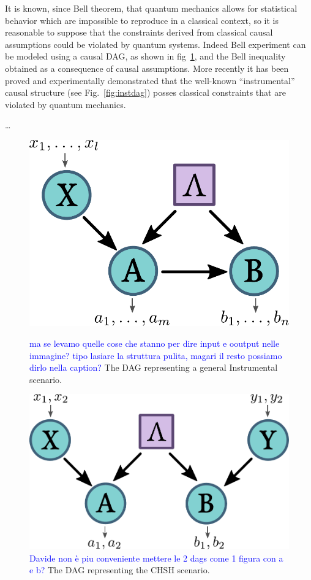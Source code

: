 \documentclass[
    nofootinbin,
    floatfix,
    amsfonts,
    twocolumn, 
    aps, 
    prl]{revtex4-1}
\begin{document}
It is known, since Bell theorem, that quantum mechanics allows for statistical %
behavior which are impossible to reproduce in a classical context, so it is
reasonable to suppose that the constraints derived from classical causal
assumptions could be violated by quantum systems.
Indeed Bell experiment can be modeled using a causal DAG, as shown in
fig~\ref{fig:chshdag}, and the Bell inequality obtained as a consequence of causal
assumptions.
More recently it has been proved and experimentally demonstrated that the
well-known ``instrumental'' causal structure (see Fig.~\ref{fig:instdag})
posses classical constraints that are violated by quantum mechanics. %

\ldots

\begin{figure}[h]
    \centering
    \parbox{.9\columnwidth}{
        \includegraphics[width=.7\columnwidth]{images/instdag.pdf}
        \caption{\textcolor{blue}{ma se levamo quelle cose che stanno per dire input e ooutput nelle immagine? tipo lasiare la struttura pulita, magari il resto possiamo dirlo nella caption?} The DAG representing a general Instrumental scenario.}
        \label{fig:instdag}
    }

    \bigskip
    \parbox{.9\columnwidth}{
        \includegraphics[width=.8\columnwidth]{images/chshdag.pdf}
        \caption{\textcolor{blue}{Davide non è piu conveniente mettere le 2 dags come 1 figura con a e b?} The DAG representing the CHSH scenario.}
        \label{fig:chshdag}
    }
\end{figure}
\end{document}
